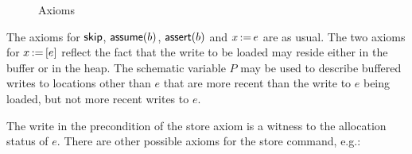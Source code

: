 \documentclass[11pt]{article}
\begin{document}
\begin{figure}[ht]
	\centering
	\caption{\label{fig:axioms}Axioms}
\end{figure}

The axioms for $\operatorname{\mathsf{skip}}$, $\operatorname{\mathsf{assume}}(b)$, $\operatorname{\mathsf{assert}}(b)$ and $x \operatorname{:\!=} e$ are as usual. The two axioms for $x \operatorname{:\!=} \left[ e \right]$ reflect the fact that the write to be loaded may reside either in the buffer or in the heap. The schematic variable $P$ may be used to describe buffered writes to locations other than $e$ that are more recent than the write to $e$ being loaded, but not more recent writes to $e$. 

The write in the precondition of the store axiom is a witness to the allocation status of $e$. There are other possible axioms for the store command, e.g.: 
\end{document}

